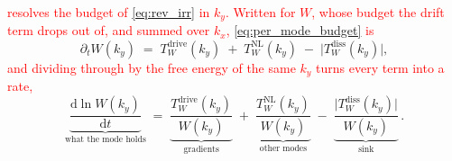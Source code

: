 \documentclass{jpp}
\newcommand{\rmd}{\text{d}}
\begin{document}
\textcolor{red}{ resolves the budget of \cref{eq:rev_irr} in $k_y.$ Written for $W$, whose budget the drift term drops out of, and summed over $k_x$, \cref{eq:per_mode_budget} is}
\begin{equation}\label{eq:per_mode_W}
\partial_t W(k_y) \;=\; T_W^\mathrm{drive}(k_y) \;+\; T_W^\mathrm{NL}(k_y) \;-\; \bigl|T_W^\mathrm{diss}(k_y)\bigr| ,
\end{equation}
\textcolor{red}{and dividing through by the free energy of the same $k_y$ turns every term into a rate,}
\begin{equation}\label{eq:per_mode_rates}
\underbrace{\frac{\rmd \ln W(k_y)}{\rmd t}}_{\text{what the mode holds}}
\;=\; \underbrace{\frac{T_W^\mathrm{drive}(k_y)}{W(k_y)}}_{\text{gradients}}
\;+\; \underbrace{\frac{T_W^\mathrm{NL}(k_y)}{W(k_y)}}_{\text{other modes}}
\;-\; \underbrace{\frac{\bigl|T_W^\mathrm{diss}(k_y)\bigr|}{W(k_y)}}_{\text{sink}}\,.
\end{equation}
\end{document}
